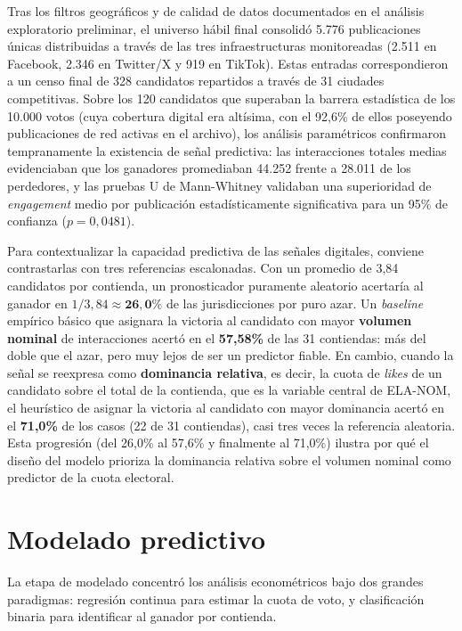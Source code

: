 Tras los filtros geográficos y de calidad de datos documentados en el análisis exploratorio preliminar, el universo hábil final consolidó 5.776 publicaciones únicas distribuidas a través de las tres infraestructuras monitoreadas (2.511 en Facebook, 2.346 en Twitter/X y 919 en TikTok). Estas entradas correspondieron a un censo final de 328 candidatos repartidos a través de 31 ciudades competitivas. Sobre los 120 candidatos que superaban la barrera estadística de los 10.000 votos (cuya cobertura digital era altísima, con el 92{,}6\% de ellos poseyendo publicaciones de red activas en el archivo), los análisis paramétricos confirmaron tempranamente la existencia de señal predictiva: las interacciones totales medias evidenciaban que los ganadores promediaban 44.252 frente a 28.011 de los perdedores, y las pruebas U de Mann-Whitney validaban una superioridad de \textit{engagement} medio por publicación estadísticamente significativa para un 95\% de confianza ($p = 0{,}0481$).

Para contextualizar la capacidad predictiva de las señales digitales, conviene contrastarlas con tres referencias escalonadas. Con un promedio de 3{,}84 candidatos por contienda, un pronosticador puramente aleatorio acertaría al ganador en $1/3{,}84 \approx \mathbf{26{,}0\%}$ de las jurisdicciones por puro azar. Un \textit{baseline} empírico básico que asignara la victoria al candidato con mayor \textbf{volumen nominal} de interacciones acertó en el \textbf{57{,}58\%} de las 31 contiendas: más del doble que el azar, pero muy lejos de ser un predictor fiable. En cambio, cuando la señal se reexpresa como \textbf{dominancia relativa}, es decir, la cuota de \textit{likes} de un candidato sobre el total de la contienda, que es la variable central de ELA-NOM, el heurístico de asignar la victoria al candidato con mayor dominancia acertó en el \textbf{71{,}0\%} de los casos (22 de 31 contiendas), casi tres veces la referencia aleatoria. Esta progresión (del 26{,}0\% al 57{,}6\% y finalmente al 71{,}0\%) ilustra por qué el diseño del modelo prioriza la dominancia relativa sobre el volumen nominal como predictor de la cuota electoral.

\section{Modelado predictivo}

La etapa de modelado concentró los análisis econométricos bajo dos grandes paradigmas: regresión continua para estimar la cuota de voto, y clasificación binaria para identificar al ganador por contienda.

